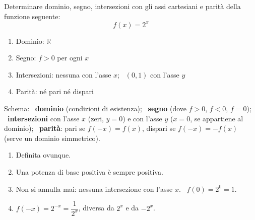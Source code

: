 \begin{question}[ID=1.9, subtitle={Studio di una funzione esponenziale}, difficulty=facile, tags={funzioni, studio di funzione, esponenziali}]
Determinare dominio, segno, intersezioni con gli assi cartesiani e parità della funzione seguente:
\begin{equation*}
    f(x)=2^x
\end{equation*}
\begin{solution}
\begin{enumerate}
    \item Dominio: $\mathbb{R}$
    \item Segno: $f>0$ per ogni $x$
    \item Intersezioni: nessuna con l'asse $x$; \ $(0,1)$ con l'asse $y$
    \item Parità: né pari né dispari
\end{enumerate}
\end{solution}
\begin{explanation}
Schema: \ \textbf{dominio} (condizioni di esistenza); \ \textbf{segno} (dove $f>0$, $f<0$, $f=0$); \ \textbf{intersezioni} con l'asse $x$ (zeri, $y=0$) e con l'asse $y$ ($x=0$, se appartiene al dominio); \ \textbf{parità}: pari se $f(-x)=f(x)$, dispari se $f(-x)=-f(x)$ (serve un dominio simmetrico).
\begin{enumerate}
    \item Definita ovunque.
    \item Una potenza di base positiva è sempre positiva.
    \item Non si annulla mai: nessuna intersezione con l'asse $x$. \ $f(0)=2^0=1$.
    \item $f(-x)=2^{-x}=\dfrac{1}{2^x}$, diversa da $2^x$ e da $-2^x$.
\end{enumerate}
\end{explanation}
\end{question}


